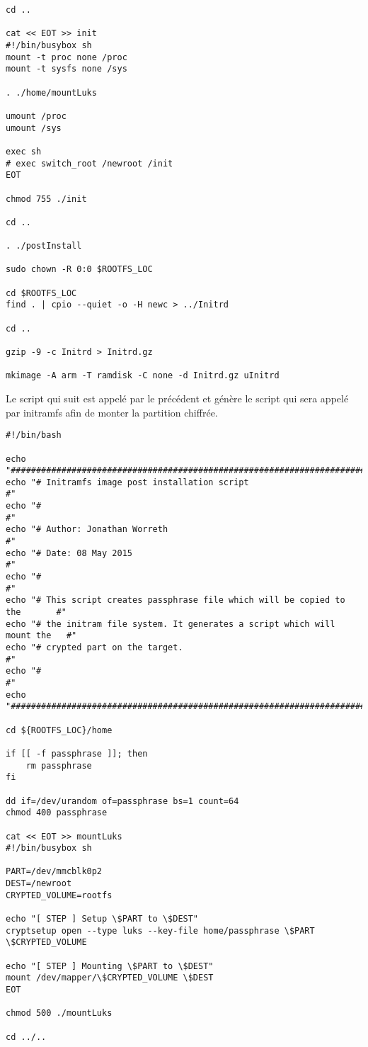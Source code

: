 \begin{lstlisting}[label=lst:initramfs,caption=Génération de l'image initramfs]
cd ..

cat << EOT >> init
#!/bin/busybox sh
mount -t proc none /proc
mount -t sysfs none /sys

. ./home/mountLuks

umount /proc
umount /sys

exec sh
# exec switch_root /newroot /init
EOT

chmod 755 ./init

cd ..

. ./postInstall

sudo chown -R 0:0 $ROOTFS_LOC

cd $ROOTFS_LOC
find . | cpio --quiet -o -H newc > ../Initrd

cd ..

gzip -9 -c Initrd > Initrd.gz

mkimage -A arm -T ramdisk -C none -d Initrd.gz uInitrd
\end{lstlisting}

Le script qui suit est appelé par le précédent et génère le script qui sera appelé par initramfs afin de monter la partition chiffrée.
\begin{lstlisting}[label=lst:luks initramfs,caption=Montage de la partition chiffrée]
#!/bin/bash

echo "#########################################################################"
echo "# Initramfs image post installation script                              #"
echo "#                                                                       #"
echo "# Author: Jonathan Worreth                                              #"
echo "# Date: 08 May 2015                                                     #"
echo "#                                                                       #"
echo "# This script creates passphrase file which will be copied to the       #"
echo "# the initram file system. It generates a script which will mount the   #"
echo "# crypted part on the target.                                           #"
echo "#                                                                       #"
echo "#########################################################################"

cd ${ROOTFS_LOC}/home

if [[ -f passphrase ]]; then
	rm passphrase
fi

dd if=/dev/urandom of=passphrase bs=1 count=64
chmod 400 passphrase

cat << EOT >> mountLuks
#!/bin/busybox sh

PART=/dev/mmcblk0p2
DEST=/newroot
CRYPTED_VOLUME=rootfs

echo "[ STEP ] Setup \$PART to \$DEST"
cryptsetup open --type luks --key-file home/passphrase \$PART \$CRYPTED_VOLUME

echo "[ STEP ] Mounting \$PART to \$DEST"
mount /dev/mapper/\$CRYPTED_VOLUME \$DEST
EOT

chmod 500 ./mountLuks

cd ../..
\end{lstlisting}

